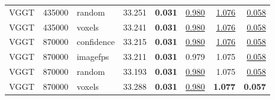 \begin{table}[H]
\begin{tabular}{lrlrrrrr}
VGGT & 435000 & random & 33.251 & \textbf{0.031} & \underline{0.980} & \underline{1.076} & \underline{0.058} \\
VGGT & 435000 & voxels & 33.241 & \textbf{0.031} & \underline{0.980} & \underline{1.076} & \underline{0.058} \\
VGGT & 870000 & confidence & 33.215 & \textbf{0.031} & \underline{0.980} & \underline{1.076} & \underline{0.058} \\
VGGT & 870000 & imagefps & 33.211 & \textbf{0.031} & 0.979 & 1.075 & \underline{0.058} \\
VGGT & 870000 & random & 33.193 & \textbf{0.031} & \underline{0.980} & 1.075 & \underline{0.058} \\
VGGT & 870000 & voxels & 33.288 & \textbf{0.031} & \underline{0.980} & \textbf{1.077} & \textbf{0.057} \\
\bottomrule
\end{tabular}
\end{table}